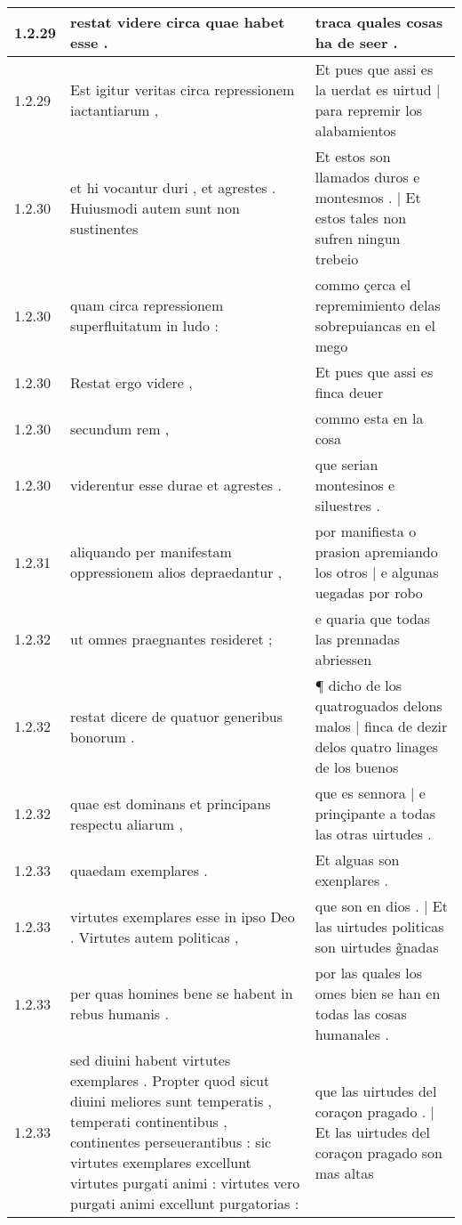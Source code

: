 \begin{tabular}{|p{1cm}|p{6.5cm}|p{6.5cm}|}
1.2.29 & restat videre circa quae habet esse . & traca quales cosas ha de seer . \\\hline
1.2.29 & Est igitur veritas circa repressionem iactantiarum , & Et pues que assi es la uerdat es uirtud | para repremir los alabamientos \\\hline
1.2.30 & et hi vocantur duri , et agrestes . Huiusmodi autem sunt non sustinentes & Et estos son llamados duros e montesmos . | Et estos tales non sufren ningun trebeio \\\hline
1.2.30 & quam circa repressionem superfluitatum in ludo : & commo çerca el repremimiento delas sobrepuiancas en el mego \\\hline
1.2.30 & Restat ergo videre , & Et pues que assi es finca deuer \\\hline
1.2.30 & secundum rem , & commo esta en la cosa \\\hline
1.2.30 & viderentur esse durae et agrestes . & que serian montesinos e siluestres . \\\hline
1.2.31 & aliquando per manifestam oppressionem alios depraedantur , & por manifiesta o prasion apremiando los otros | e algunas uegadas por robo \\\hline
1.2.32 & ut omnes praegnantes resideret ; & e quaria que todas las prennadas abriessen \\\hline
1.2.32 & restat dicere de quatuor generibus bonorum . & ¶ dicho de los quatroguados delons malos | finca de dezir delos quatro linages de los buenos \\\hline
1.2.32 & quae est dominans et principans respectu aliarum , & que es sennora | e prinçipante a todas las otras uirtudes . \\\hline
1.2.33 & quaedam exemplares . & Et alguas son exenplares . \\\hline
1.2.33 & virtutes exemplares esse in ipso Deo . Virtutes autem politicas , & que son en dios . | Et las uirtudes politicas son uirtudes g̃nadas \\\hline
1.2.33 & per quas homines bene se habent in rebus humanis . & por las quales los omes bien se han en todas las cosas humanales . \\\hline
1.2.33 & sed diuini habent virtutes exemplares . Propter quod sicut diuini meliores sunt temperatis , temperati continentibus , continentes perseuerantibus : sic virtutes exemplares excellunt virtutes purgati animi : virtutes vero purgati animi excellunt purgatorias : & que las uirtudes del coraçon pragado . | Et las uirtudes del coraçon pragado son mas altas \\\hline

\end{tabular}
